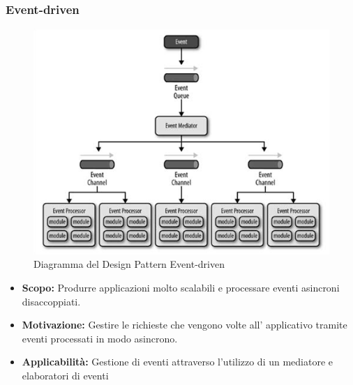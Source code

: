 \documentclass[a4paper]{article}
\begin{document}
	\subsubsection{Event-driven}
				\begin{figure}[H]
					\centering
					\includegraphics[width=\textwidth]{immagini/ST/schemaevent-driven.png}
					\caption{Diagramma del Design Pattern Event-driven}
				\end{figure}
            \begin{itemize}
				\item \textbf{Scopo:}
					Produrre applicazioni molto scalabili e processare eventi asincroni disaccoppiati.
                \item \textbf{Motivazione:} Gestire le richieste che vengono volte all' applicativo tramite eventi processati in modo asincrono.
                \item \textbf{Applicabilità:}
                	Gestione di eventi attraverso l'utilizzo di un mediatore e elaboratori di eventi		
			\end{itemize}
	
				
\end{document}
